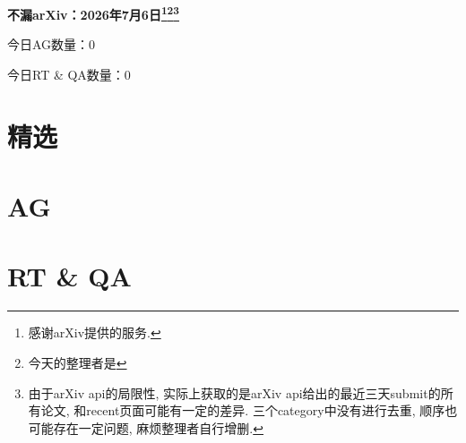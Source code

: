 \documentclass[9pt, a4paper]{article}
\theoremstyle{plain}
\theoremstyle{definition}
\theoremstyle{remark}
\newcommand{\AGnumber}{0}
\newcommand{\RTQAnumber}{0}
\newcommand{\NewestDate}{2026年7月6日}
\newcommand{\todayarXiver}{} %
\begin{document}
\begin{center}
    \Huge\textbf{不漏arXiv：\NewestDate\footnote{感谢arXiv提供的服务.}\footnote{今天的整理者是\todayarXiver}\footnote{由于arXiv api的局限性, 实际上获取的是arXiv api给出的最近三天submit的所有论文, 和recent页面可能有一定的差异. 三个category中没有进行去重, 顺序也可能存在一定问题, 麻烦整理者自行增删.}} \\
\end{center}

\setcounter{section}{-1}

\begin{center}
    今日AG数量：\AGnumber
    
    今日RT \& QA数量：\RTQAnumber
    
\end{center}


\section{精选}


\section{AG}

\section{RT \& QA}
\end{document}
